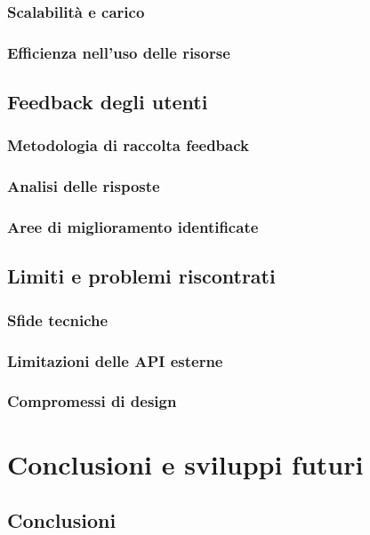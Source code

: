 \documentclass[12pt,a4paper,oneside]{report}
\begin{document}
\subsection{Scalabilità e carico}

\subsection{Efficienza nell'uso delle risorse}

\section{Feedback degli utenti}
\subsection{Metodologia di raccolta feedback}

\subsection{Analisi delle risposte}

\subsection{Aree di miglioramento identificate}

\section{Limiti e problemi riscontrati}
\subsection{Sfide tecniche}

\subsection{Limitazioni delle API esterne}

\subsection{Compromessi di design}




\chapter{Conclusioni e sviluppi futuri}
\section{Conclusioni}
\end{document}
